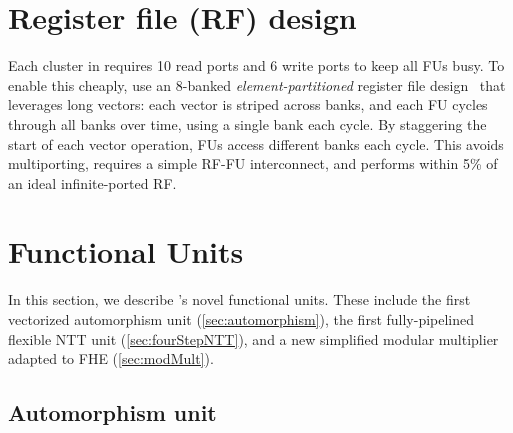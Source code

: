 \section{Register file (RF) design}  \label{sec:regfiles}
Each cluster in \name requires 10 read ports and 6 write ports to keep all FUs busy.
To enable this cheaply, use an 8-banked \emph{element-partitioned} register file design~\cite{asanovic:ucb98:vector}
that leverages long vectors:
each vector is striped across banks, and each FU cycles through all banks over time, using a single bank each cycle.
By staggering the start of each vector operation, FUs access different banks each cycle.
This avoids multiporting, requires a simple RF-FU interconnect, and performs within 5\%
of an ideal infinite-ported RF.



\section{Functional Units}
\label{sec:FUs}

In this section, we describe \name's novel functional units.
These include the first vectorized automorphism unit (\autoref{sec:automorphism}),
the first fully-pipelined flexible NTT unit (\autoref{sec:fourStepNTT}),
and a new simplified modular multiplier adapted to FHE (\autoref{sec:modMult}).

\subsection{Automorphism unit}\label{sec:automorphism}


